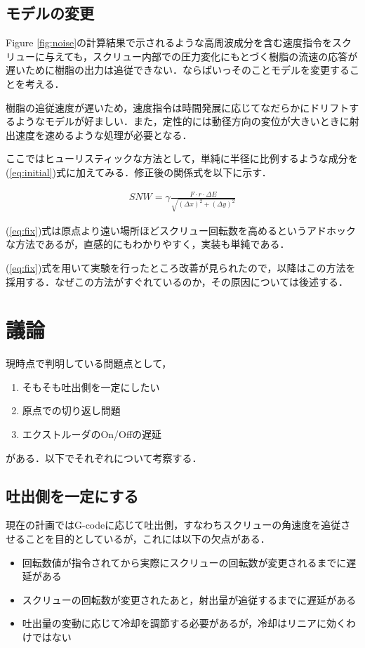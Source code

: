 \documentclass[twocolumn,oneside,a4paper]{article}
\begin{document}
\subsection{モデルの変更}
Figure \ref{fig:noise}の計算結果で示されるような高周波成分を含む速度指令をスクリューに与えても，スクリュー内部での圧力変化にもとづく樹脂の流速の応答が遅いために樹脂の出力は追従できない．ならばいっそのことモデルを変更することを考える．

樹脂の追従速度が遅いため，速度指令は時間発展に応じてなだらかにドリフトするようなモデルが好ましい．また，定性的には動径方向の変位が大きいときに射出速度を速めるような処理が必要となる．

ここではヒューリスティックな方法として，単純に半径に比例するような成分を(\ref{eq:initial})式に加えてみる．修正後の関係式を以下に示す．

\begin{eqnarray}\label{eq:fix}
  SNW = \gamma \frac{F\cdot r\cdot  \Delta E}{\sqrt{(\Delta x)^2+(\Delta y)^2}}
\end{eqnarray}

(\ref{eq:fix})式は原点より遠い場所ほどスクリュー回転数を高めるというアドホックな方法であるが，直感的にもわかりやすく，実装も単純である．

(\ref{eq:fix})式を用いて実験を行ったところ改善が見られたので，以降はこの方法を採用する．なぜこの方法がすぐれているのか，その原因については後述する．

\section{議論}
現時点で判明している問題点として，

\begin{enumerate}
     \item そもそも吐出側を一定にしたい
     \item 原点での切り返し問題
     \item エクストルーダのOn/Offの遅延
\end{enumerate}

がある．以下でそれぞれについて考察する．

\subsection{吐出側を一定にする}
現在の計画ではG-codeに応じて吐出側，すなわちスクリューの角速度を追従させることを目的としているが，これには以下の欠点がある．

\begin{itemize}
    \item 回転数値が指令されてから実際にスクリューの回転数が変更されるまでに遅延がある
    \item スクリューの回転数が変更されたあと，射出量が追従するまでに遅延がある
     \item 吐出量の変動に応じて冷却を調節する必要があるが，冷却はリニアに効くわけではない
\end{itemize}
\end{document}
